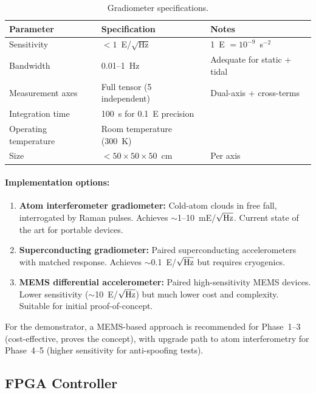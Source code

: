 \documentclass[12pt,letterpaper]{article}
\begin{document}
\begin{table}[h]
\centering
\caption{Gradiometer specifications.}
\label{tab:gradiometer}
\begin{tabular}{@{}lll@{}}
\toprule
Parameter & Specification & Notes \\
\midrule
Sensitivity & $< 1$~E/$\sqrt{\text{Hz}}$ & 1~E $= 10^{-9}$~s$^{-2}$ \\
Bandwidth & 0.01--1~Hz & Adequate for static + tidal \\
Measurement axes & Full tensor (5 independent) & Dual-axis + cross-terms \\
Integration time & 100~s for 0.1~E precision & \\
Operating temperature & Room temperature (300~K) & \\
Size & $< 50 \times 50 \times 50$~cm & Per axis \\
\bottomrule
\end{tabular}
\end{table}

\paragraph{Implementation options:}
\begin{enumerate}
\item \textbf{Atom interferometer gradiometer:} Cold-atom clouds in free
fall, interrogated by Raman pulses. Achieves $\sim$1--10~mE/$\sqrt{\rm Hz}$.
Current state of the art for portable devices.

\item \textbf{Superconducting gradiometer:} Paired superconducting
accelerometers with matched response. Achieves $\sim$0.1~E/$\sqrt{\rm Hz}$
but requires cryogenics.

\item \textbf{MEMS differential accelerometer:} Paired high-sensitivity
MEMS devices. Lower sensitivity ($\sim$10~E/$\sqrt{\rm Hz}$) but much
lower cost and complexity. Suitable for initial proof-of-concept.
\end{enumerate}

For the demonstrator, a MEMS-based approach is recommended for Phase~1--3
(cost-effective, proves the concept), with upgrade path to atom
interferometry for Phase~4--5 (higher sensitivity for anti-spoofing tests).

\subsection{FPGA Controller}
\end{document}

